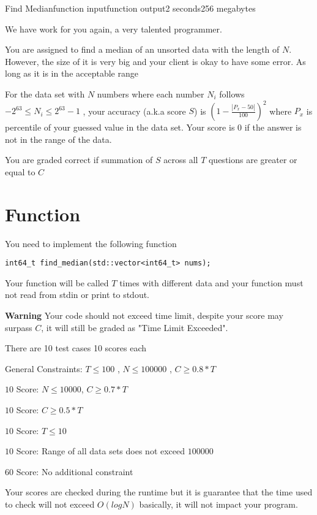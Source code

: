 \documentclass[11pt,a4paper]{article}
\begin{document}
\begin{problem}{Find Median}{function input}{function output}{2 seconds}{256 megabytes}

We have work for you again, a very talented programmer.

You are assigned to find a median of an unsorted data with the length of $N$. However, the size of it is very big and your client is okay to have some error. As long as it is in the acceptable range

For the data set with $N$ numbers where each number $N_i$ follows $-2^{63} \le N_i \le 2^{63} - 1$ , your accuracy (a.k.a score $S$) is $(1 - \frac{|P_x - 50|}{100})^2$ where $P_x$ is percentile of your guessed value in the data set. Your score is $0$ if the answer is not in the range of the data.

You are graded correct if summation of $S$ across all $T$ questions are greater or equal to $C$

\section*{Function}

You need to implement the following function

\begin{verbatim}
int64_t find_median(std::vector<int64_t> nums);
\end{verbatim}

Your function will be called $T$ times with different data and your function must not read from stdin or print to stdout.

\textbf{Warning} Your code should not exceed time limit, despite your score may surpass $C$, it will still be graded as "Time Limit Exceeded".

\Scoring

There are 10 test cases 10 scores each

General Constraints: $T \le 100$ , $N \le 100000$ , $C \ge 0.8*T$

$10$ Score: $N \le 10000$, $C \ge 0.7*T$

$10$ Score: $C \ge 0.5*T$

$10$ Score: $T \le 10$

$10$ Score: Range of all data sets does not exceed $100000$

$60$ Score: No additional constraint

Your scores are checked during the runtime but it is guarantee that the time used to check will not exceed $O(logN)$ basically, it will not impact your program.


\end{problem}
\end{document}
